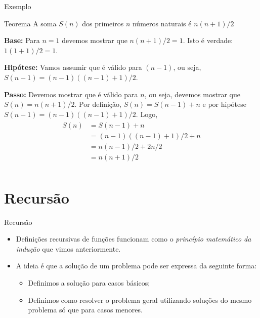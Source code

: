 \documentclass[handout]{beamer}
\begin{document}
\begin{frame}[fragile]{Exemplo}

    \begin{block}{Teorema}
        A soma $S(n)$ dos primeiros $n$ números naturais é $n(n+1)/2$
    \end{block}

    \pause
    {\bf Base:} Para $n=1$ devemos mostrar que $n(n+1)/2 = 1$. Isto é verdade: $ 1(1+1)/2 = 1.$

    \pause
    {\bf Hipótese:} Vamos assumir que é válido para $(n-1)$, ou seja, $S(n-1)=(n-1)((n-1)+1)/2$.

    \pause
    {\bf Passo:} Devemos mostrar que é válido para $n$, ou seja, devemos mostrar que $S(n) = n(n+1)/2$.
    \pause
    Por definição, $S(n) = S(n-1) + n$ e por hipótese $S(n-1)=(n-1)((n-1)+1)/2$.
    \pause
    Logo,
    \begin{eqnarray*}
        \begin{array}{rl}
        S(n) &= S(n-1) + n \\
             & = (n-1)((n-1)+1)/2 + n \\
             &= n(n-1)/2 + 2n/2 \\
             & = n(n+1)/2 \\
         \end{array}
     \end{eqnarray*}
\end{frame}



\section{Recursão}

\begin{frame}[fragile]{Recursão}

    \begin{itemize}[<+->]
        \item Definições recursivas de funções funcionam como o {\it princípio matemático da indução} que vimos anteriormente.
        \item A ideia é que a solução de um problema pode ser expressa da seguinte forma:
        \begin{itemize}
            \item Definimos a solução para casos básicos;
            \item Definimos como resolver o problema geral utilizando soluções do mesmo problema só que para casos menores.
        \end{itemize}
    \end{itemize}
\end{frame}
\end{document}
